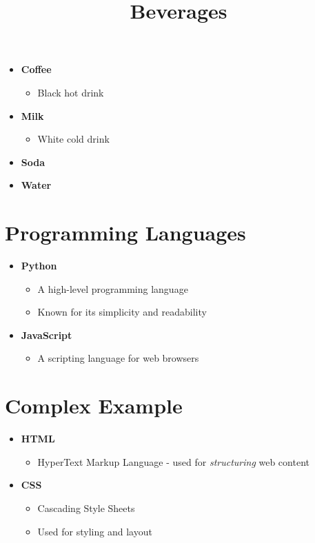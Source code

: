 \documentclass[11pt,a4paper]{article}
\title{Beverages}
\begin{document}
\maketitle

\begin{itemize}
\item \textbf{Coffee}
  \begin{itemize}
\item Black hot drink
  \end{itemize}
\item \textbf{Milk}
  \begin{itemize}
\item White cold drink
  \end{itemize}
\item \textbf{Soda}
\item \textbf{Water}
\end{itemize}

\section{Programming Languages}

\begin{itemize}
\item \textbf{Python}
  \begin{itemize}
\item A high-level programming language
\item Known for its simplicity and readability
  \end{itemize}
\item \textbf{JavaScript}
  \begin{itemize}
\item A scripting language for web browsers
  \end{itemize}
\end{itemize}

\section{Complex Example}

\begin{itemize}
\item \textbf{HTML}
  \begin{itemize}
\item HyperText Markup Language - used for \textit{structuring} web content
  \end{itemize}
\item \textbf{CSS}
  \begin{itemize}
\item Cascading Style Sheets
\item Used for styling and layout
  \end{itemize}
\end{itemize}
\end{document}
